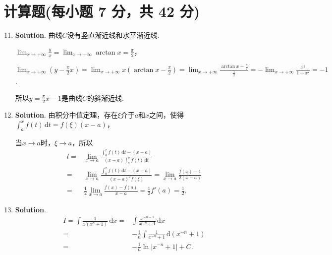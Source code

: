 \documentclass[../Main.tex]{subfiles}
\begin{document}
\section{计算题(每小题 7 分，共 42 分)}
\begin{enumerate}
    \setcounter{enumi}{10}
    \item \textbf{Solution}. 曲线$C$没有竖直渐近线和水平渐近线.

          $\lim_{x\to+\infty}\frac{y}{x}= \lim_{x\to+\infty}\arctan x = \frac{\pi}{2}$，

          $\lim_{x\to+\infty}\left(y-\frac{\pi}{2}x\right)=\lim_{x\to+\infty}x\left(\arctan
              x-\frac{\pi}{2}\right)=\lim_{x\to+\infty}\frac{\arctan x-\frac{\pi}{2}}{\frac{1}{x}}
              =-\lim_{x\to+\infty}\frac{x^{2}}{1+x^{2}}=-1$.

          所以$y=\frac{\pi}{2}x-1$是曲线$C$的斜渐近线.

    \item \textbf{Solution}. 由积分中值定理，存在$\xi$介于$a$和$x$之间，使得$\int
              _{a}^{x}f(t)\,\mathrm{d}t=f(\xi)(x-a)$，

          当$x\to a$时，$\xi\to a$，所以
          \[
              \begin{aligned}
                  l = & \lim_{x\to a}\frac{\displaystyle\int_{a}^{x}f(t)\,\mathrm{d}t-(x-a)}{(x-a)\displaystyle\int_{a}^{x}f(t)\,\mathrm{d}t}    \\
                  =   & \lim_{x\to a}\frac{\displaystyle\int_{a}^{x}f(t)\,\mathrm{d}t-(x-a)}{(x-a)^2 f(\xi)}= \lim_{x\to a}\frac{f(x)-1}{2(x-a)} \\
                  =   & \frac{1}{2}\lim_{x\to a}\frac{f(x)-f(a)}{x-a}=\frac{1}{2}f'(a)=\frac{1}{2}.
              \end{aligned}
          \]

    \item \textbf{Solution}.
          \[
              \begin{aligned}
                  I = \int\frac{1}{x(x^n+1)}\,\mathrm{d}x = & \int\frac{x^{-n-1}}{x^{-n}+1}\,\mathrm{d}x                          \\
                  =                                         & -\frac{1}{n}\int\frac{1}{x^{-n}+1}\,\mathrm{d}\left(x^{-n}+1\right) \\
                  =                                         & -\frac{1}{n}\ln\left|x^{-n}+1\right|+C.
              \end{aligned}
          \]


\end{enumerate}
\end{document}
